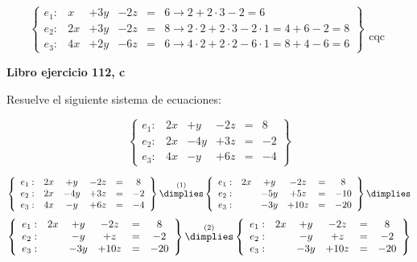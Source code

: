 \documentclass[palatino,nosec,nochap]{Docencia}
\begin{document}
\begin{problem}
\[
\left\{\begin{array}{lccccl}
e_1: &x&+3y&-2z&=&6 \to 2+2·3-2 = 6\\
e_2: &2x&+3y&-2z&=&8 \to 2·2 + 2·3-2·1 = 4+6-2 = 8\\
e_3: &4x&+2y&-6z&=&6 \to 4·2+2·2-6·1 = 8+4-6 = 6  
\end{array}\right\} \begin{array}{c}\\\\\\\\\text{cqc}\end{array}
\]
\end{problem}


\newpage
\begin{problem}
\textbf{Libro ejercicio 112, c}

Resuelve el siguiente sistema de ecuaciones:

\[
\left\{\begin{array}{lccccc}
e_1: &	2x &	+	y &		- 2z &	= & 8 \\
e_2: &	2x &	-	4y &	+ 3z &	= & -2 \\
e_3: &	4x &	-	y &		+ 6z &	= & -4 
\end{array}\right\}
\]

\solution


\[
\left\{\begin{array}{lccccc}
e_1: &	2x &	+	y &		- 2z &	= & 8 \\
e_2: &	2x &	-	4y &	+ 3z &	= & -2 \\
e_3: &	4x &	-	y &		+ 6z &	= & -4 
\end{array}\right\}
\overset{(1)}{\dimplies}
\left\{\begin{array}{lccccc}
e_1: &	2x &	+	y &		- 2z &	= & 8 \\
e_2: &	   &	-	5y &	+ 5z &	= & -10\\
e_3: &	   &	-	3y &	+ 10z &	= & -20\\
\end{array}\right\}
\dimplies\]
\[
\left\{\begin{array}{lccccc}
e_1: &	2x &	+	y &		- 2z &	= & 8 \\
e_2: &	   &	-	y &		+  z &	= & -2\\
e_3: &	   &	-	3y &	+ 10z &	= & -20\\
\end{array}\right\}
\overset{(2)}{\dimplies}
\left\{\begin{array}{lccccc}
e_1: &	2x &	+	y &		- 2z &	= & 8 \\
e_2: &	   &	-	y &		+  z &	= & -2\\
e_3: &	   &	-	3y &	+ 10z &	= & -20\\
\end{array}\right\}
\]



\end{problem}
\end{document}
